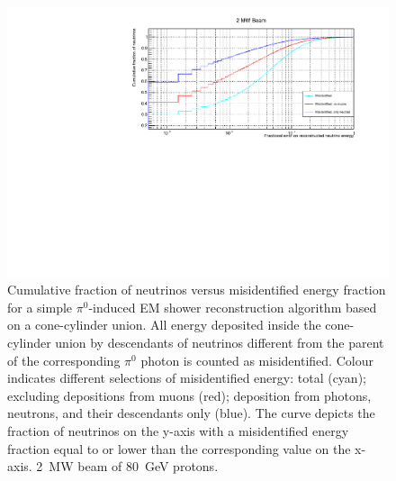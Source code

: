 \documentclass[a4paper]{article}
\begin{document}
\begin{figure}[tbp]
	\centering
	\includegraphics[width=\textwidth]{Figures/2MW/misid_rel_y}
	\caption[Pile-up study neutrino vs.\ misidentified energy fraction, \SI{2}{\mega\watt} beam]{%
		Cumulative fraction of neutrinos versus misidentified energy fraction for a simple $\pi^0$-induced EM shower reconstruction algorithm based on a cone-cylinder union.
		All energy deposited inside the cone-cylinder union by descendants of neutrinos different from the parent of the corresponding $\pi^0$ photon is counted as misidentified.
		Colour indicates different selections of misidentified energy: total (cyan); excluding depositions from muons (red); deposition from photons, neutrons, and their descendants only (blue).
		The curve depicts the fraction of neutrinos on the y-axis with a misidentified energy fraction equal to or lower than the corresponding value on the x-axis.
		\SI{2}{\mega\watt} beam of \SI{80}{\giga\electronvolt} protons.
	}
	\label{fig:dune-nd_2MW_misid-rel-y}
\end{figure}
\end{document}
